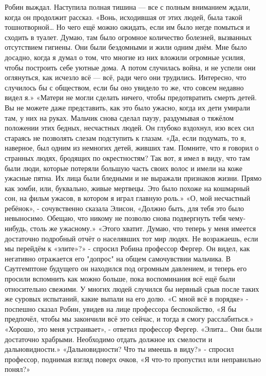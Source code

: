 \documentclass[a4paper,12pt]{book}
\begin{document}
	Робин выждал. Наступила полная тишина — все с полным вниманием ждали, когда он продолжит рассказ.
	«Вонь, исходившая от этих людей, была такой тошнотворной… Но чего ещё можно ожидать, если им было негде помыться и сходить в туалет. Думаю, там было огромное количество болезней, вызванных отсутствием гигиены. Они были бездомными и жили одним днём. Мне было досадно, когда я думал о том, что многие из них вложили огромные усилия, чтобы построить себе уютные дома. А потом случилась война, и не успели они оглянуться, как исчезло всё — всё, ради чего они трудились. Интересно, что случилось бы с обществом, если бы оно увидело то же, что совсем недавно видел я.»
	«Матери не могли сделать ничего, чтобы предотвратить смерть детей. Вы не можете даже представить, как это было ужасно, когда их дети умирали там, у них на руках.
	Мальчик снова сделал паузу, раздумывая о тяжёлом положении этих бедных, несчастных людей. Он глубоко вздохнул, изо всех сил стараясь не позволять слезам подступить к глазам.
	«Да, если подумать, то я, наверное, был одним из немногих детей, живших там. Помните, что я говорил о странных людях, бродящих по окрестностям? Так вот, я имел в виду, что там были люди, которые потеряли большую часть своих волос и имели на коже ужасные пятна. Их лица были бледными и не выражали признаков жизни. Прямо как зомби, или, буквально, живые мертвецы. Это было похоже на кошмарный сон, на фильм ужасов, в котором я играл главную роль.»
	«О, мой несчастный ребёнок», - сочувственно сказала Элисон,
	«Должно быть, для тебя это было невыносимо. Обещаю, что никому не позволю снова подвергнуть тебя чему-нибудь, столь же ужасному.»
	«Этого хватит. Думаю, что теперь у меня имеется достаточно подробный отчёт о населявших тот мир людях. Не возражаешь, если мы перейдём к «элите»?» - спросил Робина профессор Фергер. Он видел, как негативно отражается его "допрос" на общем самочувствии мальчика. В Саутгемптоне будущего он находился под огромным давлением, и теперь его просили вспомнить как можно больше, пока воспоминания всё ещё были относительно свежими. У многих людей случился бы нервный срыв после таких же суровых испытаний, какие выпали на его долю.
	«С мной всё в порядке» - поспешно сказал Робин, увидев на лице профессора беспокойство,
	«Я бы предпочёл, чтобы мы закончили всё это сейчас, и тогда я смогу расслабиться.»
	«Хорошо, это меня устраивает», - ответил профессор Фергер.
	«Элита… Они были достаточно храбрыми. Необходимо отдать должное их смелости и дальновидности.»
	«Дальновидности? Что ты имеешь в виду?» - спросил профессор, поднимая взгляд поверх очков,
	«Я что-то пропустил или неправильно понял?»
\end{document}
